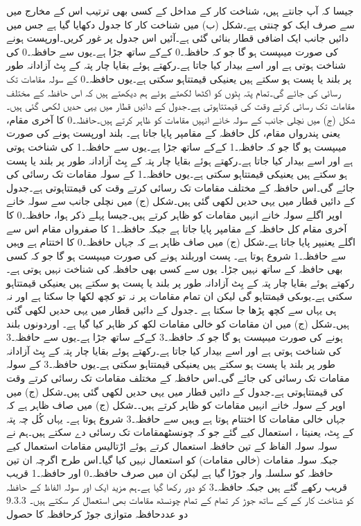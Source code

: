 	جیسا کہ آپ جانتے ہیں، شناخت کار کے مداخل کے کسی بھی ترتیب اس کے مخارج میں سے صرف ایک کو چنتی ہے۔شکل (ب) میں شناخت کار کا جدول دکھایا گیا ہے جس میں دائیں جانب ایک اضافی قطار بنائی گئی ہے۔آئیں اس جدول پر غور کریں۔اورپست ہونے کی صورت میںپست ہو گا جو کہ حافظہ۔0 کےکے ساتھ جڑا ہے۔یوں سے حافظہ۔0 کی شناخت ہوتی ہے اور اسے بیدار کیا جاتا ہے۔رکھتے ہوئے بقایا چار پتہ کے بِٹ آزادانہ طور پر بلند یا پست ہو سکتے ہیں یعنیکی قیمتتاہو سکتی ہے۔یوں حافظہ۔0 کے سولہ مقامات تک رسائی کی جائے گی۔تمام پتہ بِٹوں کو اکٹھا لکھتے ہوئے ہم دیکھتے ہیں کہ اس حافظہ کے مختلف مقامات تک رسائی کرتے وقت کی قیمتتاہوتی ہے۔جدول کے دائیں قطار میں یہی حدیں لکھی گئی ہیں۔شکل (ج) میں نچلی جانب کے سولہ خانے انہیں مقامات کو ظاہر کرتے ہیں۔حافظہ۔0 کا آخری مقام، یعنی پندرواں مقام، کل حافظہ کے مقامپر پایا جاتا ہے۔
	بلند اورپست ہونے کی صورت میںپست ہو گا جو کہ حافظہ۔1 کےکے ساتھ جڑا ہے۔یوں سے حافظہ۔1 کی شناخت ہوتی ہے اور اسے بیدار کیا جاتا ہے۔رکھتے ہوئے بقایا چار پتہ کے بِٹ آزادانہ طور پر بلند یا پست ہو سکتے ہیں یعنیکی قیمتتاہو سکتی ہے۔یوں حافظہ۔1 کے سولہ مقامات تک رسائی کی جائے گی۔اس حافظہ کے مختلف مقامات تک رسائی کرتے وقت کی قیمتتاہوتی ہے۔جدول کے دائیں قطار میں یہی حدیں لکھی گئی ہیں۔شکل (ج) میں نچلی جانب سے سولہ خانے اوپر اگلے سولہ خانے انہیں مقامات کو ظاہر کرتے ہیں۔جیسا پہلے ذکر ہوا، حافظہ۔0 کا آخری مقام کل حافظہ کے مقامپر پایا جاتا ہے جبکہ حافظہ۔1 کا صفرواں مقام اس سے اگلے یعنیپر پایا جاتا ہے۔شکل (ج) میں صاف ظاہر ہے کہ جہاں حافظہ۔0 کا اختتام ہے وہیں سے حافظہ۔1 شروع ہوتا ہے۔
	پست اوربلند ہونے کی صورت میںپست ہو گا جو کہ کسی بھی حافظہ کے ساتھ نہیں جڑا۔ یوں سے کسی بھی حافظہ کی شناخت نہیں ہوتی ہے۔رکھتے ہوئے بقایا چار پتہ کے بِٹ آزادانہ طور پر بلند یا پست ہو سکتے ہیں یعنیکی قیمتتاہو سکتی ہے۔یوںکی قیمتتاہو گی لیکن ان تمام مقامات پر نہ تو کچھ لکھا جا سکتا ہے اور نہ ہی یہاں سے کچھ پڑھا جا سکتا ہے ۔جدول کے دائیں قطار میں یہی حدیں لکھی گئی ہیں۔شکل (ج) میں ان مقامات کو خالی مقامات لکھ کر ظاہر کیا گیا ہے۔	
	 اوردونوں بلند ہونے کی صورت میںپست ہو گا جو کہ حافظہ۔3 کےکے ساتھ جڑا ہے۔یوں سے حافظہ۔3 کی شناخت ہوتی ہے اور اسے بیدار کیا جاتا ہے۔رکھتے ہوئے بقایا چار پتہ کے بِٹ آزادانہ طور پر بلند یا پست ہو سکتے ہیں یعنیکی قیمتتاہو سکتی ہے۔یوں حافظہ۔3 کے سولہ مقامات تک رسائی کی جائے گی۔اس حافظہ کے مختلف مقامات تک رسائی کرتے وقت کی قیمتتاہوتی ہے۔جدول کے دائیں قطار میں یہی حدیں لکھی گئی ہیں۔شکل (ج) میں اوپر کے سولہ خانے انہیں مقامات کو ظاہر کرتے ہیں۔۔شکل (ج) میں صاف ظاہر ہے کہ جہاں خالی مقامات کا اختتام ہوتا ہے وہیں سے حافظہ۔3  شروع ہوتا ہے۔
	یہاں کُل چہ پتہ کے بِٹ، یعنیتا ، استعمال کیے گئے جو کہ چونسٹھمقامات تک رسائی دے سکتے ہیں۔ہم نے سولہ سولہ الفاظ کے تین حافظہ استعمال کرتے ہوئے اڑتالیس مقامات استعمال کیے جبکہ سولہ مقامات (خالی مقامات) کو استعمال نہیں کیا گیا۔اس طرح اگرچہ ان تین حافظہ کو سلسلہ وار جوڑا گیا ہے لیکن ان میں صرف حافظہ۔0 اور حافظہ۔1 قریب قریب رکھے گئے ہیں جبکہ حافظہ۔3 کو دور رکھا گیا ہے۔ہم مزید ایک اور سولہ الفاظ کے حافظہ کو شناخت کار کے کے ساتھ جوڑ کر تمام کے تمام چونسٹھ مقامات بھی استعمال کر سکتے ہیں۔
9.3.3 دو عددحافظہ متوازی جوڑ کرحافظہ کا حصول



